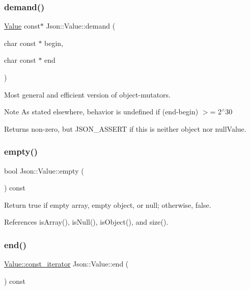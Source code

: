 \subsubsection{\texorpdfstring{demand()}{demand()}}
{\footnotesize\ttfamily \hyperlink{classJson_1_1Value}{Value} const$\ast$ Json\+::\+Value\+::demand (\begin{DoxyParamCaption}\item[{char const $\ast$}]{begin,  }\item[{char const $\ast$}]{end }\end{DoxyParamCaption})}

Most general and efficient version of object-\/mutators. \begin{DoxyNote}{Note}
As stated elsewhere, behavior is undefined if (end-\/begin) $>$= 2$^\wedge$30 
\end{DoxyNote}
\begin{DoxyReturn}{Returns}
non-\/zero, but J\+S\+O\+N\+\_\+\+A\+S\+S\+E\+RT if this is neither object nor null\+Value. 
\end{DoxyReturn}
\mbox{\label{classJson_1_1Value_a0519a551e37ee6665d74742b3f96bab3_a0519a551e37ee6665d74742b3f96bab3}} 
\subsubsection{\texorpdfstring{empty()}{empty()}}
{\footnotesize\ttfamily bool Json\+::\+Value\+::empty (\begin{DoxyParamCaption}{ }\end{DoxyParamCaption}) const}



Return true if empty array, empty object, or null; otherwise, false. 



References is\+Array(), is\+Null(), is\+Object(), and size().

\mbox{\label{classJson_1_1Value_a3e443cd0ef24f7e028b175e47ee045e0_a3e443cd0ef24f7e028b175e47ee045e0}} 
\subsubsection{\texorpdfstring{end()}{end()}\hspace{0.1cm}{\footnotesize\ttfamily [1/2]}}
{\footnotesize\ttfamily \hyperlink{classJson_1_1Value_af92282ca92b58b320debd486afb7696a_af92282ca92b58b320debd486afb7696a}{Value\+::const\+\_\+iterator} Json\+::\+Value\+::end (\begin{DoxyParamCaption}{ }\end{DoxyParamCaption}) const}



